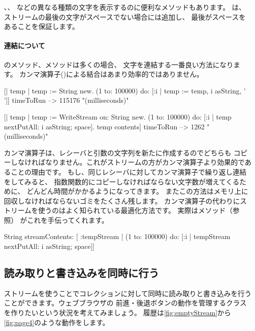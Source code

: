 \documentclass[a4paper,10pt,twoside]{book}
\begin{document}
、、 
などの異なる種類の文字を表示するのに便利なメソッドもあります。
は、ストリームの最後の文字がスペースでない場合には追加し、
最後がスペースをあることを保証します。

\paragraph{連結について}

のメソッド、メソッドは多くの場合、
文字を連結する一番良い方法になります。
カンマ演算子(\ct{,})による結合はあまり効率的ではありません。


\begin{code}{}
[| temp |
  temp := String new.
  (1 to: 100000)
    do: [:i | temp := temp, i asString, ' ']] timeToRun --> 115176 "(milliseconds)"

[| temp |
  temp := WriteStream on: String new.
  (1 to: 100000)
    do: [:i | temp nextPutAll: i asString; space].
  temp contents] timeToRun --> 1262 "(milliseconds)"
\end{code}

カンマ演算子は、レシーバと引数の文字列を新たに作成するのでどちらも
コピーしなければなりません。これがストリームの方がカンマ演算子より効果的であることの理由です。
もし、同じレシーバに対してカンマ演算子で繰り返し連結をしてみると、
指数関数的にコピーしなければならない文字数が増えてくるために、
どんどん時間がかかるようになってきます。
またこの方法はメモリ上に回収しなければならないゴミをたくさん残します。
カンマ演算子の代わりにストリームを使うのはよく知られている最適化方法です。
実際はメソッド（\pageref{sec:streamContents}参照）
がこれを手伝ってくれます。


\begin{code}{}
String streamContents: [ :tempStream |
  (1 to: 100000)
       do: [:i | tempStream nextPutAll: i asString; space]] 
\end{code}

\subsection{読み取りと書き込みを同時に行う}

ストリームを使うことでコレクションに対して同時に読み取りと書き込みを行うことができます。ウェブブラウザの
前進・後退ボタンの動作を管理するクラスを作りたいという状況を考えてみましょう。
履歴は\ref{fig:emptyStream}から\ref{fig:page4}のような動作をします。
\end{document}
